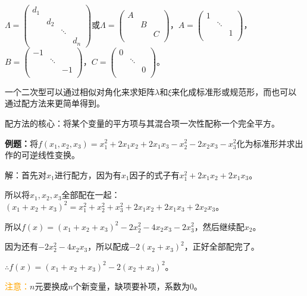 \documentclass[UTF8, 12pt]{ctexart}
\begin{document}
$\Lambda=\left(\begin{array}{cccc}
    d_1 \\
     & d_2 \\
     & & \ddots \\
     & & & d_n
\end{array}\right)$或$\Lambda=\left(\begin{array}{ccccccccc}
    A \\
     & B \\
     & & C \\
\end{array}\right)$，$A=\left(\begin{array}{ccc}
    1 \\
     & \ddots \\
     & & 1 \\
\end{array}\right)$，$B=\left(\begin{array}{ccc}
    -1 \\
     & \ddots \\
     & & -1 \\
\end{array}\right)$，$C=\left(\begin{array}{ccc}
    0 \\
     & \ddots \\
     & & 0 \\
\end{array}\right)$。\medskip

一个二次型可以通过相似对角化来求矩阵$\lambda$和$\xi$来化成标准形或规范形，而也可以通过配方法来更简单得到。

配方法的核心：将某个变量的平方项与其混合项一次性配称一个完全平方。

\textbf{例题：}将$f(x_1,x_2,x_3)=x_1^2+2x_1x_2+2x_1x_3-x_2^2-2x_2x_3-x_3^2$化为标准形并求出作的可逆线性变换。

解：首先对$x_1$进行配方，因为有$x_1$因子的式子有$x_1^2+2x_1x_2+2x_1x_3$。

所以将$x_1,x_2,x_3$全部配在一起：$(x_1+x_2+x_3)^2=x_1^2+x_2^2+x_3^2+2x_1x_2+2x_1x_3+2x_2x_3$。

所以$f(x)=(x_1+x_2+x_3)^2-2x_2^2-4x_2x_3-2x_3^2$，然后继续配$x_2$。

因为还有$-2x_2^2-4x_2x_3$，所以配成$-2(x_2+x_3)^2$，正好全部配完了。

$\therefore f(x)=(x_1+x_2+x_3)^2-2(x_2+x_3)^2$。

\textcolor{orange}{注意：}$n$元要换成$n$个新变量，缺项要补项，系数为0。
\end{document}
